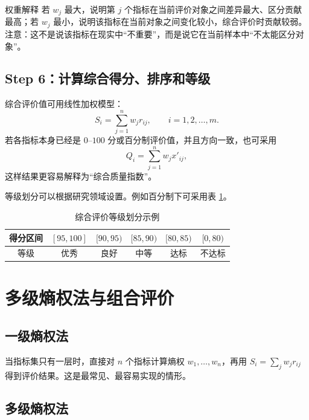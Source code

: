 \documentclass[UTF8,a4paper,12pt]{ctexart}
\begin{document}
\begin{methodbox}{权重解释}
若 $w_j$ 最大，说明第 $j$ 个指标在当前评价对象之间差异最大、区分贡献最高；若 $w_j$ 最小，说明该指标在当前对象之间变化较小，综合评价时贡献较弱。注意：这不是说该指标在现实中“不重要”，而是说它在当前样本中“不太能区分对象”。
\end{methodbox}

\subsection{Step 6：计算综合得分、排序和等级}

综合评价值可用线性加权模型：
\begin{equation}
 S_i=\sum_{j=1}^{n}w_j r_{ij},\qquad i=1,2,\ldots,m.
\end{equation}
若各指标本身已经是 $0$--$100$ 分或百分制评价值，并且方向一致，也可采用
\begin{equation}
 Q_i=\sum_{j=1}^{n}w_j x'_{ij},
\end{equation}
这样结果更容易解释为“综合质量指数”。

等级划分可以根据研究领域设置。例如百分制下可采用表 \ref{tab:levels}。

\begin{table}[H]
\centering
\caption{综合评价等级划分示例}
\label{tab:levels}
\begin{tabular}{cccccc}
\toprule
得分区间 & $[95,100]$ & $[90,95)$ & $[85,90)$ & $[80,85)$ & $[0,80)$\\
\midrule
等级 & 优秀 & 良好 & 中等 & 达标 & 不达标\\
\bottomrule
\end{tabular}
\end{table}

\section{多级熵权法与组合评价}

\subsection{一级熵权法}

当指标集只有一层时，直接对 $n$ 个指标计算熵权 $w_1,\ldots,w_n$，再用 $S_i=\sum_jw_jr_{ij}$ 得到评价结果。这是最常见、最容易实现的情形。

\subsection{多级熵权法}
\end{document}
